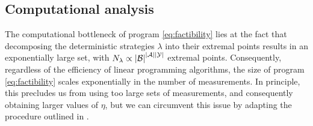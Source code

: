 \documentclass[a4paper,preprintnumbers,floatfix,superscriptaddress,pra,twocolumn,showpacs,notitlepage,longbibliography]{revtex4-2}
\begin{document}
 \subsection{Computational analysis}
 The computational bottleneck of program \eqref{eq:factibility} lies at the fact that decomposing the deterministic strategies $\lambda$ into their extremal points results in an exponentially large set, with $N_\lambda \propto \abs{\mathcal{B}}^{\abs{\mathcal{A}} \abs{\mathcal{Y}}}$ extremal points. Consequently, regardless of the efficiency of linear programming algorithms, the size of program \eqref{eq:factibility} scales exponentially in the number of measurements. 
    In principle, this precludes us from using too large sets of measurements, and consequently obtaining larger  values of $\eta$, but we can circumvent this issue by adapting the procedure outlined in \cite{fillettaz-algorithmic-2018}.
    
\end{document}
